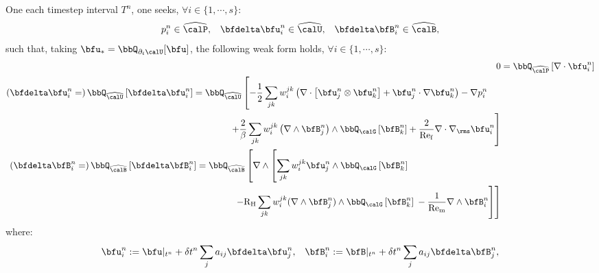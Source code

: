 \begin{example}
        One each timestep interval $T^{n}$, one seeks, $\forall i \in \{1, \cdots, s\}$:
        \begin{align}
                       p_{i}^{n}  \in  \widehat{\calP},  &&
            \bfdelta\bfu_{i}^{n}  \in  \widehat{\calU},  &&
            \bfdelta\bfB_{i}^{n}  \in  \widehat{\calB},
        \end{align}
        such that, taking $\bfu_{*} = \bbQ_{\partial_{t}\calU}[\bfu]$, the following weak form holds, $\forall i \in \{1, \cdots, s\}$:
        \begin{align}
                0
                &=
                \bbQ_{\widehat{\calP}}\left[\nabla\cdot\bfu_{i}^{n}\right]  \\
            \begin{split}
                \left(\bfdelta\bfu_{i}^{n}
                =\right)
                \bbQ_{\widehat{\calU}}\left[\bfdelta\bfu_{i}^{n}\right]
                &=
                \bbQ_{\widehat{\calU}}\left[- \frac{1}{2}\sum_{jk}w_{i}^{jk}\left(\nabla\cdot\left[\bfu_{j}^{n}\otimes\bfu_{k}^{n}\right]
                + \bfu_{j}^{n}\cdot\nabla\bfu_{k}^{n}\right)
                - \nabla p_{i}^{n}\right.  \\
                &\qquad\qquad\left.+ \frac{2}{\beta}\sum_{jk}w_{i}^{jk}\left(\nabla\wedge\bfB_{j}^{n}\right)\wedge\bbQ_{\calG}\left[\bfB_{k}^{n}\right]
                + \frac{2}{\rmRef}\nabla\cdot\nabla_{\rms}\bfu_{i}^{n}\right]
            \end{split}  \\
            \begin{split}
                \left(\bfdelta\bfB_{i}^{n}
                =\right)
                \bbQ_{\widehat{\calB}}\left[\bfdelta\bfB_{i}^{n}\right]
                &=
                \bbQ_{\widehat{\calB}}\left[\nabla\wedge\left[\sum_{jk}w_{i}^{jk}\bfu_{j}^{n}\wedge\bbQ_{\calG}\left[\bfB_{k}^{n}\right]
                \right.\right.  \\
                &\qquad\qquad\left.\left.- \rmRH\sum_{jk}w_{i}^{jk}(\nabla\wedge\bfB_{j}^{n})\wedge\bbQ_{\calG}\left[\bfB_{k}^{n}\right]\tall - \frac{1}{\rmRem}\nabla\wedge\bfB_{i}^{n}\right]\right]
            \end{split}
        \end{align}
        where:
        \begin{align}
            \bfu_{i}^{n}  :=  \bfu|_{t^{n}} + \delta t^{n}\sum_{j}a_{ij}\bfdelta\bfu_{j}^{n},  &&
            \bfB_{i}^{n}  :=  \bfB|_{t^{n}} + \delta t^{n}\sum_{j}a_{ij}\bfdelta\bfB_{j}^{n},

\end{align}
\end{example}
